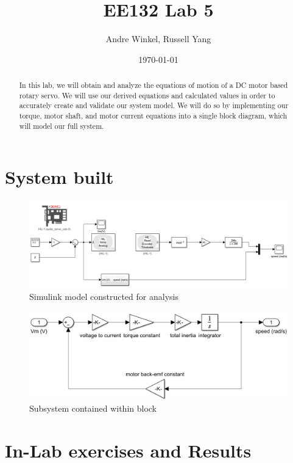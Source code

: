 \documentclass{article}
\title{EE132 Lab 5}
\author{Andre Winkel, Russell Yang}
\date{\today}
\begin{document}
\maketitle

\begin{abstract}
    In this lab, we will obtain and analyze the equations of motion of a DC motor based rotary servo. We will use our derived equations and calculated values in order to accurately create and validate our system model. We will do so by implementing our torque, motor shaft, and motor current equations into a single block diagram, which will model our full system.
\end{abstract}

\section{System built} 
\begin{figure} [H]
    \centering
    \includegraphics[width=0.75\linewidth]{system.png}
    \caption{Simulink model constructed for analysis}
    \label{fig:1}
\end{figure}
\begin{figure} [H]
    \centering
    \includegraphics[width=0.75\linewidth]{subsystem.png}
    \caption{Subsystem contained within block}
    \label{fig:2}
\end{figure}

\section{In-Lab exercises and Results}
\end{document}
